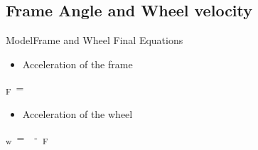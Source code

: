 \subsection{Frame Angle and Wheel velocity}
\begin{frame}{Model}{Frame and Wheel Final Equations}
	\begin{itemize}
		\item Acceleration of the frame
	\end{itemize}
\small
	\begin{flalign}
\si{\ddot{\theta}_F = } \nonumber
	\end{flalign}
	\vspace{0.5cm}
\normalsize	
%
\begin{itemize}
	\item Acceleration of the wheel
\end{itemize}
\small
	\begin{flalign}
\si{\ddot{\theta}_w =  - \ddot{\theta}_F} \nonumber
	\end{flalign}
\normalsize
	
\end{frame}


